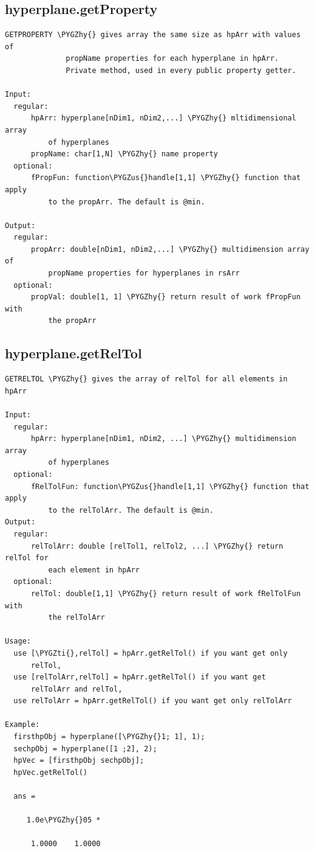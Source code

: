 \documentclass[letterpaper,10pt,english]{sphinxmanual}
\def\PYGZus{\char`\_}
\def\PYGZhy{\char`\-}
\def\PYGZti{\char`\~}
\begin{document}
\subsection{hyperplane.getProperty}
\label{chap_functions:hyperplane-getproperty}
\begin{Verbatim}[commandchars=\\\{\}]
GETPROPERTY \PYGZhy{} gives array the same size as hpArr with values of
              propName properties for each hyperplane in hpArr.
              Private method, used in every public property getter.

Input:
  regular:
      hpArr: hyperplane[nDim1, nDim2,...] \PYGZhy{} mltidimensional array
          of hyperplanes
      propName: char[1,N] \PYGZhy{} name property
  optional:
      fPropFun: function\PYGZus{}handle[1,1] \PYGZhy{} function that apply
          to the propArr. The default is @min.

Output:
  regular:
      propArr: double[nDim1, nDim2,...] \PYGZhy{} multidimension array of
          propName properties for hyperplanes in rsArr
  optional:
      propVal: double[1, 1] \PYGZhy{} return result of work fPropFun with
          the propArr
\end{Verbatim}


\subsection{hyperplane.getRelTol}
\label{chap_functions:hyperplane-getreltol}
\begin{Verbatim}[commandchars=\\\{\}]
GETRELTOL \PYGZhy{} gives the array of relTol for all elements in hpArr

Input:
  regular:
      hpArr: hyperplane[nDim1, nDim2, ...] \PYGZhy{} multidimension array
          of hyperplanes
  optional:
      fRelTolFun: function\PYGZus{}handle[1,1] \PYGZhy{} function that apply
          to the relTolArr. The default is @min.
Output:
  regular:
      relTolArr: double [relTol1, relTol2, ...] \PYGZhy{} return relTol for
          each element in hpArr
  optional:
      relTol: double[1,1] \PYGZhy{} return result of work fRelTolFun with
          the relTolArr

Usage:
  use [\PYGZti{},relTol] = hpArr.getRelTol() if you want get only
      relTol,
  use [relTolArr,relTol] = hpArr.getRelTol() if you want get
      relTolArr and relTol,
  use relTolArr = hpArr.getRelTol() if you want get only relTolArr

Example:
  firsthpObj = hyperplane([\PYGZhy{}1; 1], 1);
  sechpObj = hyperplane([1 ;2], 2);
  hpVec = [firsthpObj sechpObj];
  hpVec.getRelTol()

  ans =

     1.0e\PYGZhy{}05 *

      1.0000    1.0000
\end{Verbatim}
\end{document}
